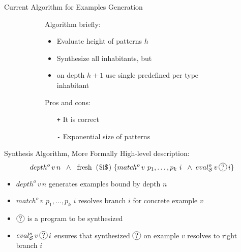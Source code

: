 \documentclass[aspectratio=169
  , xcolor={svgnames}
  , hyperref={ colorlinks,citecolor=Blue
             , linkcolor=DarkRed,urlcolor=DarkBlue}
  , russian
  ]{beamer}
\newcommand*\circled[1]{\tikz[baseline=(char.base)]{
    \node[shape=circle,draw,inner sep=1pt] (char) {#1};}}
\begin{document}
\begin{frame}{Current Algorithm for Examples Generation}
\begin{figure}
\begin{subfigure}[b]{0.45\linewidth}
Algorithm briefly:
\begin{itemize}
\item Evaluate height of patterns $h$
\item Synthesize all inhabitants, but
\item on depth $h+1$ use single predefined per type inhabitant 
\end{itemize}
\end{subfigure}
\hspace{.5cm}
\begin{subfigure}[b]{0.45\linewidth}
Pros and cons:
\begin{itemize}
\item[\texttt{+}] It is correct
\item[\texttt{-}] Exponential size of patterns
\end{itemize}
\end{subfigure}
\end{figure}

\end{frame}


\begin{frame}{Synthesis Algorithm, More Formally }
High-level description:
\[
depth^o\,v\,n \;\; \wedge \;\;
\mbox{\lstinline|fresh ($i$)|}\; \{match^o\,v\,\,p_1,\dots,p_k\,\,i \;\;\wedge \;
eval^o_{\mathcal S}\,v\,\circled{?}\,i\}
\]

\begin{itemize}
\item $depth^o\,v\,n$ generates examples bound by depth $n$
\item $match^o\,v\,\,p_1,\dots,p_k\,\,i$ resolves branch $i$ for concrete example $v$
\item $\circled{?}$ is a program to be synthesized
\item $eval^o_{\mathcal S}\,v\,\circled{?}\,i$ ensures that synthesized $\circled{?}$ on example $v$ resolves to right branch $i$
\end{itemize}


\end{frame}
\end{document}
